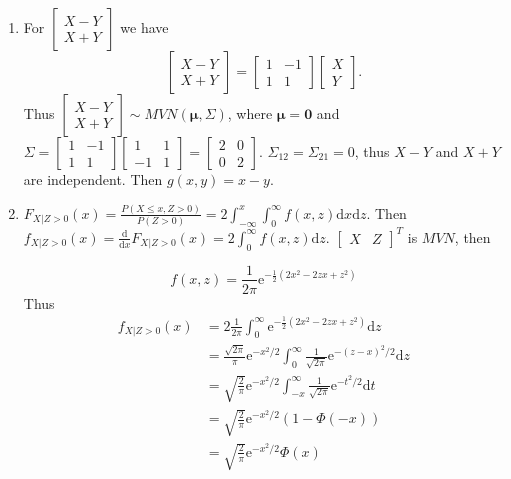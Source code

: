 \documentclass{article}
\begin{document}
\begin{enumerate}[leftmargin = 0 em, label = \arabic*., font = \bfseries]
\begin{enumerate}
 		\item 
 		For $\begin{bmatrix}
 			X - Y\\
 			X + Y
 		\end{bmatrix}$ we have
 		\[\begin{bmatrix}
 			X-Y\\
 			X+Y
 		\end{bmatrix} = \begin{bmatrix}
 			1 & -1\\
 			1 & 1
 		\end{bmatrix}
 		\begin{bmatrix}
 			X\\
 			Y
 		\end{bmatrix}.\] Thus $\begin{bmatrix}
 			X - Y\\
 			X+Y
 		\end{bmatrix} \sim MVN(\bm \mu, \Sigma)$, where $\bm \mu = \bm 0$ and $\Sigma = \begin{bmatrix}
 			1& -1\\
 			1 & 1
 		\end{bmatrix}
 		\begin{bmatrix}
 			1 & 1\\
 			-1 & 1
 		\end{bmatrix} = 
 		\begin{bmatrix}
 			2 & 0\\
 			0 & 2
 		\end{bmatrix}$. $\Sigma_{12} = \Sigma_{21} = 0$, thus $X-Y$ and $X+Y$ are independent. Then $g(x,y) = x-y$.

 		\item 
 		$F_{X|Z>0} (x) = \frac{P(X \leq x, Z >0)}{P(Z > 0)} = 2 \int_{-\infty}^x \int_{0}^{\infty} f(x,z) \mathrm{d}x \mathrm{d}z.$ Then $f_{X|Z>0} (x) = \frac{\mathrm{d}}{\mathrm{d}x} F_{X|Z>0}(x) = 2 \int_{0}^{\infty} f(x, z)\mathrm{d}z$. $\begin{bmatrix}
 		 			X & Z
 		 		\end{bmatrix}^{T}$ is $MVN$, then 

 		\[f(x,z) = \frac{1}{2 \pi} \mathrm{e}^{-\frac{1}{2}(2 x^2  - 2 z x + z^2)}\]
 		Thus
 		\begin{align*}
 		f_{X|Z>0}(x) & = 2 \frac{1}{2 \pi}\int_{0}^{\infty} \mathrm{e}^{-\frac{1}{2}(2x^2 - 2 zx + z^2)} \mathrm{d}z\\
 		& = \frac{\sqrt{2 \pi}}{\pi}\mathrm{e}^{-x^2 / 2} \int_{0}^\infty \frac{1}{\sqrt{2 \pi}}\mathrm{e}^{- (z - x)^2 / 2} \mathrm{d}z\\
 		& = \sqrt{\frac{2}{\pi}}\mathrm{e}^{-x^2 / 2} \int_{-x}^\infty \frac{1}{\sqrt{2 \pi}}\mathrm{e}^{- t^2 / 2} \mathrm{d}t\\
 		& = \sqrt{\frac{2}{\pi}}\mathrm{e}^{-x^2 / 2} (1 - \Phi (- x))\\
 		& = \sqrt{\frac{2}{\pi}}\mathrm{e}^{-x^2 / 2} \Phi(x)
 		\end{align*}
 		


\end{enumerate}
\end{enumerate}
\end{document}
